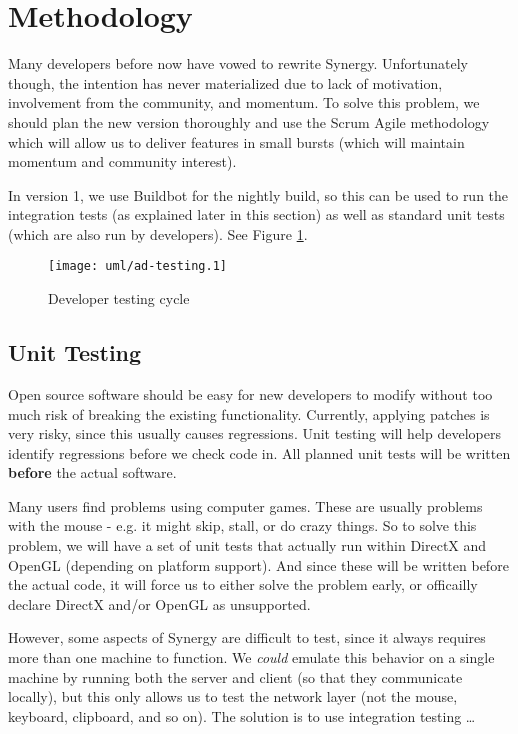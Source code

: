 \section{Methodology}

Many developers before now have vowed to rewrite Synergy. Unfortunately though,
the intention has never materialized due to lack of motivation, involvement from
the community, and momentum.
To solve this problem, we should plan the new version thoroughly and use the
Scrum Agile methodology which will allow us to deliver features in small 
bursts (which will maintain momentum and community interest).

In version 1, we use Buildbot for the nightly build, so this can be used to run
the integration tests (as explained later in this section) as well as standard 
unit tests (which are also run by developers). See Figure \ref{fig:devTesting}.

\begin{figure}[ht!]
  \centering
  \texttt{[image: uml/ad-testing.1]}
  \caption{Developer testing cycle}
  \label{fig:devTesting}
\end{figure}

\subsection{Unit Testing}

Open source software should be easy for new developers to modify without too
much risk of breaking the existing functionality. Currently, applying patches 
is very risky, since this usually causes regressions. Unit testing will help 
developers identify regressions before we check code in. All planned unit tests
will be written \textbf{before} the actual software.

Many users find problems using computer games. These are usually problems with
the mouse - e.g. it might skip, stall, or do crazy things. So to solve this 
problem, we will have a set of unit tests that actually run within DirectX and
OpenGL (depending on platform support). And since these will be written before
the actual code, it will force us to either solve the problem early, or 
officailly declare DirectX and/or OpenGL as unsupported.

However, some aspects of Synergy are difficult to test, since it always requires
more than one machine to function. We \textit{could} emulate this behavior on a 
single machine by running both the server and client (so that they communicate 
locally), but this only allows us to test the network layer (not the mouse,
keyboard, clipboard, and so on). The solution is to use integration testing
\ldots

